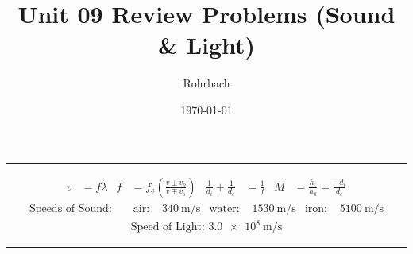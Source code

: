 \documentclass[10pt]{exam}
\title{Unit 09 Review Problems (Sound \& Light)}
\author{Rohrbach}
\date{\today}
\begin{document}
\maketitle

\newcommand{\printeq}{
  \hrule
  \small
  \begin{align*}
      v   &=  f\lambda
    & f   &= f_s \left( \frac{v\pm v_o}{v\mp v_s} \right)
    & \frac{1}{d_i} + \frac{1}{d_o} &= \frac{1}{f}
    & M &= \frac{h_i}{h_0} = \frac{-d_i}{d_o}
  \end{align*}
  \vspace{-1em}
  \begin{align*}
    \text{Speeds of Sound: } & 
    & \text{air: }   & \SI{340}{\meter\per\second}
    & \text{water: } & \SI{1530}{\meter\per\second}
    & \text{iron: }  & \SI{5100}{\meter\per\second}
  \end{align*}
  \vspace{-2em}
  \begin{align*}
    \text{Speed of Light: }
    \SI{3.0e8}{\meter\per\second}
  \end{align*}
  
  \hrule
}

\printeq
\end{document}
